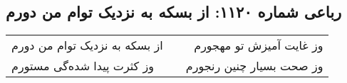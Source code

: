 \begin{center}
\section*{رباعی شماره ۱۱۲۰: از بسکه به نزدیک توام من دورم}
\label{sec:1120}
\begin{longtable}{l p{0.5cm} r}
از بسکه به نزدیک توام من دورم
&&
وز غایت آمیزش تو مهجورم
\\
وز کثرت پیدا شده‌گی مستورم
&&
وز صحت بسیار چنین رنجورم
\\
\end{longtable}
\end{center}
